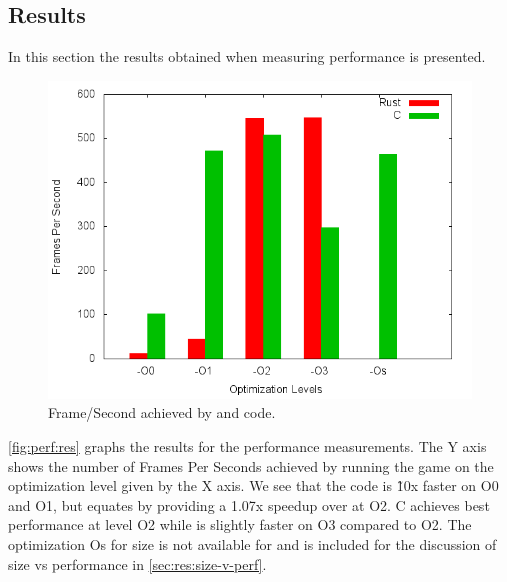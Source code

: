 \begin{description}
    \item[]
\end{description}

\subsection{Results}
\label{sec:perf:res}

In this section the results obtained when measuring performance is presented.

\begin{figure}[H]
  \begin{center}
    \includegraphics[scale=0.5]{results/plots/perf/perf.png}
  \end{center}
  \caption{Frame/Second achieved by {\C} and {\rust} code.}
  \label{fig:perf:res}
\end{figure}

\autoref{fig:perf:res} graphs the results for the performance measurements.
The Y axis shows the number of Frames Per Seconds achieved by running the game on the optimization level given by the X axis.
We see that the {\C} code is \~10x faster on O0 and O1, but {\rust} equates by providing a 1.07x speedup over {\C} at O2.
C achieves best performance at level O2 while {\rust} is slightly faster on O3 compared to O2.
The optimization Os for size is not available for {\rust} and is included for the discussion of size vs performance in \autoref{sec:res:size-v-perf}.

